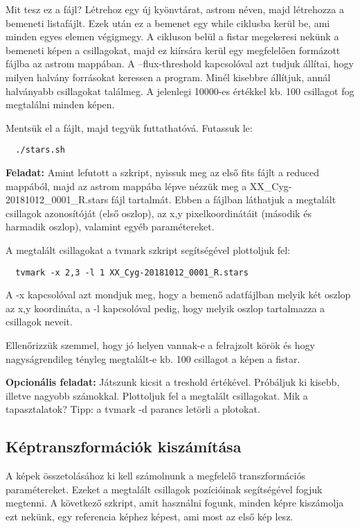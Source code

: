 \documentclass{article}
\begin{document}
Mit tesz ez a fájl? Létrehoz egy új kyönvtárat, astrom néven, majd létrehozza a
bemeneti listafájlt. Ezek után ez a bemenet egy while ciklusba kerül be, ami
minden egyes elemen végigmegy. A cikluson belül a fistar megekeresi nekünk a
bemeneti képen a csillagokat, majd ez kiírsára kerül egy megfelelően formázott
fájlba az astrom mappában.
A --flux-threshold kapcsolóval azt tudjuk állítai, hogy milyen halvány
forrásokat keressen a program. Minél kisebbre  állítjuk, annál halványabb
csillagokat találmeg. A jelenlegi 10000-es értékkel kb. 100 csillagot fog
megtalálni minden képen.

Mentsük el a fájlt, majd tegyük futtathatóvá. Futassuk le:

\begin{verbatim}
  ./stars.sh
\end{verbatim}

{\bf Feladat:}
Amint lefutott a szkript, nyissuk meg az első fits fájlt a reduced mappából,
majd az astrom mappába lépve nézzük meg a XX\_Cyg-20181012\_0001\_R.stars fájl
tartalmát. Ebben a fájlban láthatjuk a megtalált csillagok azonosítóját (első
oszlop), az x,y pixelkoordinátáit (második és harmadik oszlop), valamint
egyéb paramétereket.

A megtalált csillagokat a tvmark szkript segítségével plottoljuk fel:

\begin{verbatim}
  tvmark -x 2,3 -l 1 XX_Cyg-20181012_0001_R.stars
\end{verbatim}

A -x kapcsolóval azt mondjuk meg, hogy a bemenő adatfájlban melyik két oszlop
az x,y koordináta, a -l kapcsolóval pedig, hogy melyik oszlop tartalmazza a
csillagok neveit.

Ellenőrizzük szemmel, hogy jó helyen vannak-e a felrajzolt körök és hogy
nagyságrendileg tényleg megtalált-e kb. 100 csillagot a képen a fistar.

{\bf Opcionális feladat:}
Játszunk kicsit a treshold értékével. Próbáljuk ki kisebb, illetve nagyobb
számokkal. Plottoljuk fel a megtalált csillagokat. Mik a tapasztalatok?
Tipp: a tvmark -d parancs letörli a plotokat.

\subsection{Képtranszformációk kiszámítása}

A képek összetolásához ki kell számolnunk a megfelelő transzformációs
paramétereket. Ezeket a megtalált csillagok pozícióinak segítségével fogjuk
megtenni. A következő szkript, amit használni fogunk, minden képre kiszámolja
ezt nekünk, egy referencia képhez képest, ami most az első kép lesz.
\end{document}
